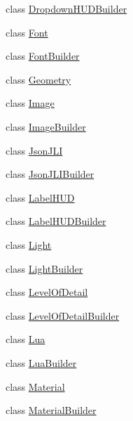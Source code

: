 \begin{DoxyCompactItemize}
\item 
class \mbox{\hyperlink{classnjli_1_1_world_factory_ace95ee82bd9b0868dca558d191db23fd}{Dropdown\+H\+U\+D\+Builder}}
\item 
class \mbox{\hyperlink{classnjli_1_1_world_factory_ad564b94b59dc295de3dfc4415d95cca8}{Font}}
\item 
class \mbox{\hyperlink{classnjli_1_1_world_factory_aa1571d8b2e1c2d040a767ed3b23f5e25}{Font\+Builder}}
\item 
class \mbox{\hyperlink{classnjli_1_1_world_factory_a9aca7b7350e6ffa0e2d6320834ad1857}{Geometry}}
\item 
class \mbox{\hyperlink{classnjli_1_1_world_factory_a5d6b29a75202aeeaef335faca9eb55e2}{Image}}
\item 
class \mbox{\hyperlink{classnjli_1_1_world_factory_a6e4a3b87650c7e051e932fc81e2b2ad5}{Image\+Builder}}
\item 
class \mbox{\hyperlink{classnjli_1_1_world_factory_a1c7fea89e4146ea859f344c20bf17ac7}{Json\+J\+LI}}
\item 
class \mbox{\hyperlink{classnjli_1_1_world_factory_afbd2803f566fe8f3d08650c15f61b2f7}{Json\+J\+L\+I\+Builder}}
\item 
class \mbox{\hyperlink{classnjli_1_1_world_factory_aa8844d2831cd99e31cc82dd81b171f11}{Label\+H\+UD}}
\item 
class \mbox{\hyperlink{classnjli_1_1_world_factory_abcd9b8ad9755b1de56dd38ef4a89037f}{Label\+H\+U\+D\+Builder}}
\item 
class \mbox{\hyperlink{classnjli_1_1_world_factory_a27862a9fe512b352f98ec1c054680edd}{Light}}
\item 
class \mbox{\hyperlink{classnjli_1_1_world_factory_a8cd2216c776d440c957f9961ce19b1bd}{Light\+Builder}}
\item 
class \mbox{\hyperlink{classnjli_1_1_world_factory_a30b1a5fe07be473df6700c36c640ed17}{Level\+Of\+Detail}}
\item 
class \mbox{\hyperlink{classnjli_1_1_world_factory_a719da6b5d45b216585e173af095bb963}{Level\+Of\+Detail\+Builder}}
\item 
class \mbox{\hyperlink{classnjli_1_1_world_factory_a92273d66fac956d168c3dcbd891ae6bf}{Lua}}
\item 
class \mbox{\hyperlink{classnjli_1_1_world_factory_a6ff54f81b70b57898d3cb747e0ad258d}{Lua\+Builder}}
\item 
class \mbox{\hyperlink{classnjli_1_1_world_factory_aa1212b6e372a0f45d2c01f3cd203af77}{Material}}
\item 
class \mbox{\hyperlink{classnjli_1_1_world_factory_ab38588cd27b640aa96c8788441852561}{Material\+Builder}}

\end{DoxyCompactItemize}
